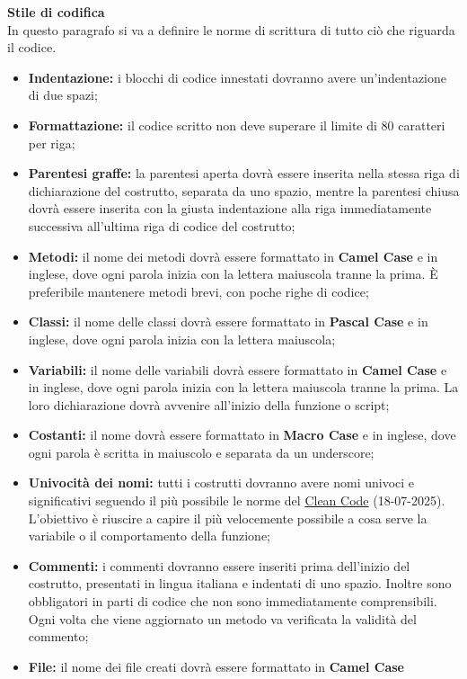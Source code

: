 \noindent \textbf{Stile di codifica}\label{ref:stile}\\
In questo paragrafo si va a definire le norme di scrittura di tutto ciò che riguarda il codice.
\begin{itemize}
    \item \textbf{Indentazione:} i blocchi di codice innestati dovranno avere un’indentazione di due spazi;
    \item \textbf{Formattazione:} il codice scritto non deve superare il limite di 80 caratteri per riga;
    \item \textbf{Parentesi graffe:} la parentesi aperta dovrà essere inserita nella stessa riga di dichiarazione del
    costrutto, separata da uno spazio, mentre la parentesi chiusa dovrà essere inserita con la giusta
    indentazione alla riga immediatamente successiva all’ultima riga di codice del costrutto;
    \item \textbf{Metodi:} il nome dei metodi dovrà essere formattato in \textbf{Camel Case} e in inglese, dove ogni parola inizia con la lettera maiuscola tranne la prima.
    È preferibile mantenere metodi brevi, con poche righe di codice;
    \item \textbf{Classi:} il nome delle classi dovrà essere formattato in \textbf{Pascal Case} e in inglese, dove ogni parola inizia con la lettera maiuscola;
    \item \textbf{Variabili:} il nome delle variabili dovrà essere formattato in \textbf{Camel Case} e in inglese, dove ogni parola inizia con la lettera maiuscola tranne la prima.
    La loro dichiarazione dovrà avvenire all’inizio della funzione o script;
    \item \textbf{Costanti:} il nome dovrà essere formattato in \textbf{Macro Case} e in inglese, dove ogni parola è scritta in maiuscolo e separata da un underscore;
    \item \textbf{Univocità dei nomi:} tutti i costrutti dovranno avere nomi univoci e significativi seguendo il più possibile le norme del \href{https://medium.com/@pabashani.herath/clean-code-naming-conventions-4cac223de3c6#77bb}{Clean Code} (18-07-2025).\\
    L'obiettivo è riuscire a capire il più velocemente possibile a cosa serve la variabile o il comportamento della funzione;
    \item \textbf{Commenti:} i commenti dovranno essere inseriti prima dell’inizio del costrutto, presentati in lingua
    italiana e indentati di uno spazio. Inoltre sono obbligatori in parti di codice che non sono immediatamente comprensibili.
    Ogni volta che viene aggiornato un metodo va verificata la validità del commento;
    \item \textbf{File:} il nome dei file creati dovrà essere formattato in \textbf{Camel Case}
\end{itemize} 
\vspace{1em}

